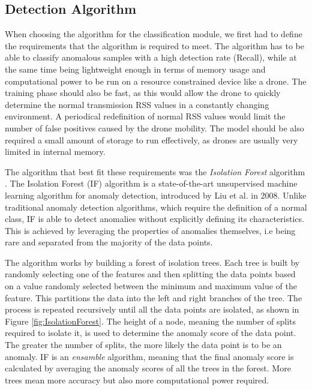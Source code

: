 \documentclass[futureinternet,article,submit,pdftex,moreauthors]{Definitions/mdpi}
\begin{document}
\subsection {Detection Algorithm}

When choosing the algorithm for the classification module, we first had to define the requirements that the algorithm is required to meet. The algorithm has to be able to classify anomalous samples with a high detection rate (Recall), while at the same time 
being lightweight enough in terms of memory usage and computational power to be run on a resource constrained device like a drone. The training phase should also be fast, as this would allow the drone to quickly determine the normal transmission RSS values in a constantly changing environment. A periodical redefinition of normal RSS values would 
limit the number of false positives caused by the drone mobility. 
The model should be also required a small amount of storage to run effectively, as drones are usually very limited in internal memory. 

The algorithm that best fit these requirements was the \textit{Isolation Forest} algorithm \cite{IsolationForestLiu}. The Isolation Forest (IF) algorithm is a state-of-the-art unsupervised machine learning algorithm for anomaly detection, introduced by Liu et al. in 2008. 
Unlike traditional anomaly detection algorithms, which require the definition of a normal class, IF is able to detect anomalies without explicitly defining its characteristics.
This is achieved by leveraging the properties of anomalies themselves, i.e being rare and separated from the majority of the data points. 

The algorithm works by building a forest of isolation trees. Each tree is built by randomly selecting one of the features and then splitting the data points based on a value randomly selected between the minimum and maximum value of the feature. This partitions the data into the 
left and right branches of the tree. The process is repeated recursively until all the data points are isolated, as shown in Figure \ref{fig:IsolationForest}. The height of a node, meaning the number of splits required to isolate it, is used to determine the anomaly score of the data point. The greater the number of splits, the more likely the data point is to be an anomaly.
IF is an \textit{ensamble} algorithm, meaning that the final anomaly score is calculated by averaging the anomaly scores of all the trees in the forest. More trees mean more accuracy but also more computational power required.
\end{document}
